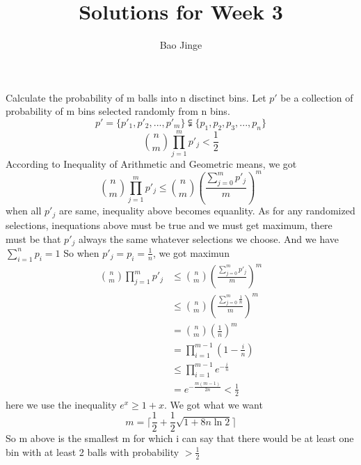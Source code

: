 \documentclass{article}
\author{Bao Jinge}
\title{Solutions for Week 3}
\date{}
\begin{document}
	\maketitle
	\section{}


	\section{}
	Calculate the probability of m balls into n disctinct bins. Let $p'$ be a collection of probability of m bins selected randomly from n bins. 
	$$p' = \{p'_1, p'_2,...,p'_m\} \subsetneqq \{p_1, p_2, p_3,...,p_n\}$$
	$$\binom{n}{m}\prod_{j=1}^{m}{p'_j} < \frac{1}{2}$$
	According to Inequality of Arithmetic and Geometric means,
	we got 
	$$\binom{n}{m}\prod_{j=1}^{m}{p'_j} \leq \binom{n}{m}{(\frac{\sum_{j=0}^{m}{p'_j}}{m})^m}$$
	when all $p'_j$ are same, inequality above becomes equanlity.
	As for any randomized selections, inequations above must be true and we must get maximum, there must be that $p'_j$ always the same whatever selections we choose. And we have $\sum_{i=1}^{n}p_i = 1$
	So when $p'_j = p_i = \frac{1}{n}$, we got maximun
	\begin{equation}
	\begin{aligned}
	\binom{n}{m}\prod_{j=1}^{m}{p'_j} &\leq \binom{n}{m}{(\frac{\sum_{j=0}^{m}{p'_j}}{m})^m}\\
		&\leq \binom{n}{m}{(\frac{\sum_{j=0}^{m}{\frac{1}{n}}}{m})^m}\\
		&= \binom{n}{m}(\frac{1}{n})^m\\
		&= \prod_{i=1}^{m-1}(1-\frac{i}{n})\\
		&\leq \prod_{i=1}^{m-1}e^{-\frac{i}{n}}\\
		&= e^{-\frac{m(m-1)}{2n}}
	<\frac{1}{2}
	\end{aligned}
	\end{equation}
	here we use the inequality $e^x \geq 1+x$.
	We got what we want
	$$m = \lceil \frac{1}{2}+\frac{1}{2}\sqrt{1+8n\ln{2}} \rceil$$
	So m above is the smallest m for which i can say that there would be at least one bin with at least 2 balls with probability $>\frac{1}{2}$
\end{document}
